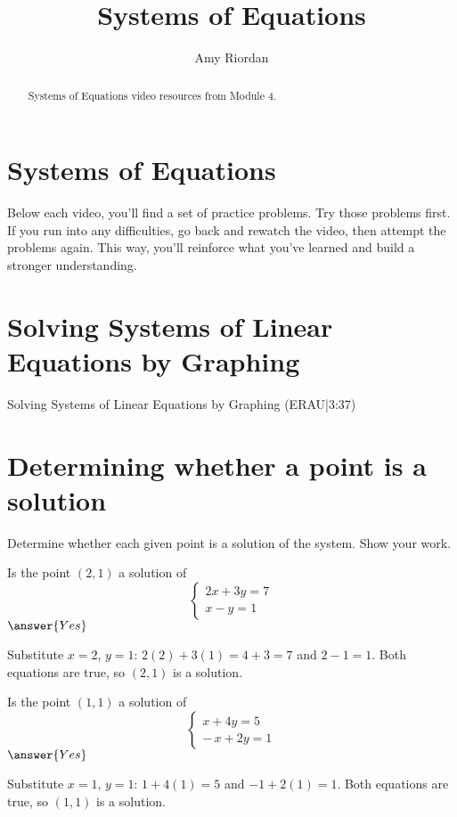 \documentclass{ximera}
\title{Systems of Equations}
\author{Amy Riordan}
\begin{document}
\begin{abstract}
Systems of Equations video resources from Module 4.
\end{abstract}
\maketitle

\section*{Systems of Equations}

Below each video, you’ll find a set of practice problems. Try those problems first. If you run into any difficulties, go back and rewatch the video, then attempt the problems again. This way, you’ll reinforce what you’ve learned and build a stronger understanding.

\section*{Solving Systems of Linear Equations by Graphing}

Solving Systems of Linear Equations by Graphing (ERAU|3:37)


\section*{Determining whether a point is a solution}

Determine whether each given point is a solution of the system. Show your work.

\begin{problem}
Is the point $(2,1)$ a solution of
\[
\begin{cases}
2x + 3y = 7\\
x - y = 1
\end{cases}
\]
$\answer{Yes}$
\begin{feedback}
Substitute $x=2$, $y=1$: $2(2)+3(1)=4+3=7$ and $2-1=1$. Both equations are true, so $(2,1)$ is a solution.
\end{feedback}
\end{problem}

\begin{problem}
Is the point $(1,1)$ a solution of
\[
\begin{cases}
x + 4y = 5\\
-\,x + 2y = 1
\end{cases}
\]
$\answer{Yes}$
\begin{feedback}
Substitute $x=1$, $y=1$: $1+4(1)=5$ and $-1+2(1)=1$. Both equations are true, so $(1,1)$ is a solution.
\end{feedback}
\end{problem}
\end{document}
